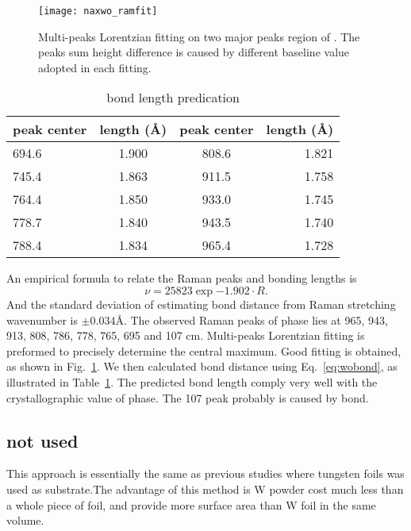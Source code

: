 \begin{figure}[htb]
\centering
\texttt{[image: naxwo\_ramfit]}
\caption[ Raman fitting]{Multi-peaks Lorentzian fitting on two major peaks region of . The peaks sum height difference is caused by different baseline value adopted in each fitting.}
\label{fig:naworamfit}
\end{figure}

\begin{table}[htb]
\centering
\caption{ bond length predication}\label{tab:nawobond}
\begin{tabular}{lccr}
\toprule
peak center & length (\AA) & peak center & length (\AA) \\
\midrule
694.6 & 1.900 &  808.6 &  1.821 \\
745.4 & 1.863 &  911.5 &  1.758 \\
764.4 & 1.850 &  933.0 &  1.745 \\
778.7 & 1.840 &   943.5 & 1.740 \\
788.4 & 1.834 &   965.4 & 1.728 \\
\bottomrule
\end{tabular}
\end{table}

An empirical formula to relate the Raman peaks and  bonding lengths \cite{Hardcastle1995} is
\begin{equation}\label{eq:wobond}
\nu = 25823 \exp{-1.902\cdot R}.
\end{equation}
And the standard deviation of estimating  bond distance from Raman stretching wavenumber is $\pm0.034$\AA.
The observed Raman peaks of  phase lies at 965, 943, 913, 808, 786, 778, 765, 695 and 107 cm. Multi-peaks Lorentzian fitting is preformed to precisely determine the central maximum. Good fitting is obtained, as shown in Fig.~\ref{fig:naworamfit}. We then calculated  bond distance using Eq.~\ref{eq:wobond}, as illustrated in Table~\ref{tab:nawobond}. The predicted  bond length comply very well with the crystallographic value of  phase.\cite{Triantafyllou1999a} The 107 peak probably is caused by  bond.


\subsection{not used}

This approach is essentially the same as previous studies where tungsten foils was used as substrate.The advantage of this method is W powder cost much less than a whole piece of foil, and provide more surface area than W foil in the same volume.

